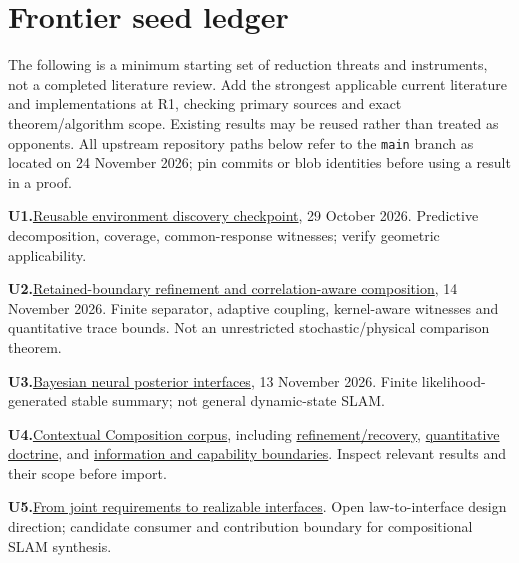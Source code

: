 \documentclass[11pt,letterpaper]{article}
\newcommand{\refitem}[2]{\par\noindent\textbf{#1}\enspace #2}
\begin{document}
\section{Frontier seed ledger}\label{sec:frontier}
The following is a minimum starting set of reduction threats and instruments, not a completed literature review. Add the strongest applicable current literature and implementations at R1, checking primary sources and exact theorem/algorithm scope. Existing results may be reused rather than treated as opponents. All upstream repository paths below refer to the \texttt{main} branch as located on 24 November 2026; pin commits or blob identities before using a result in a proof.
\small
\refitem{U1.}{\href{https://github.com/eternal-november/eos-research-programmes/tree/main/projects/decomposition-equipment/discovery/reusable-environment-discovery-compact-sources/reusable_environment_discovery_checkpoint}{Reusable environment discovery checkpoint}, 29 October 2026. Predictive decomposition, coverage, common-response witnesses; verify geometric applicability.}
\refitem{U2.}{\href{https://github.com/eternal-november/eos-research-programmes/tree/main/projects/contextual-composition/feedback-and-concurrency/retained-boundary-refinement}{Retained-boundary refinement and correlation-aware composition}, 14 November 2026. Finite separator, adaptive coupling, kernel-aware witnesses and quantitative trace bounds. Not an unrestricted stochastic/physical comparison theorem.}
\refitem{U3.}{\href{https://github.com/eternal-november/eos-research-programmes/tree/main/projects/contextual-composition/applications/bayesian-posterior-interfaces}{Bayesian neural posterior interfaces}, 13 November 2026. Finite likelihood-generated stable summary; not general dynamic-state SLAM.}
\refitem{U4.}{\href{https://github.com/eternal-november/eos-research-programmes/tree/main/projects/contextual-composition}{Contextual Composition corpus}, including \href{https://github.com/eternal-november/eos-research-programmes/tree/main/projects/contextual-composition/protocols/refinement-recovery}{refinement/recovery}, \href{https://github.com/eternal-november/eos-research-programmes/tree/main/projects/contextual-composition/applications/quantitative-doctrine}{quantitative doctrine}, and \href{https://github.com/eternal-november/eos-research-programmes/blob/main/projects/contextual-composition/research-directions/information-and-capability-boundaries.md}{information and capability boundaries}. Inspect relevant results and their scope before import.}
\refitem{U5.}{\href{https://github.com/eternal-november/eos-research-programmes/blob/main/projects/contextual-composition/research-directions/from-joint-requirements-to-interfaces.md}{From joint requirements to realizable interfaces}. Open law-to-interface design direction; candidate consumer and contribution boundary for compositional SLAM synthesis.}
\end{document}
